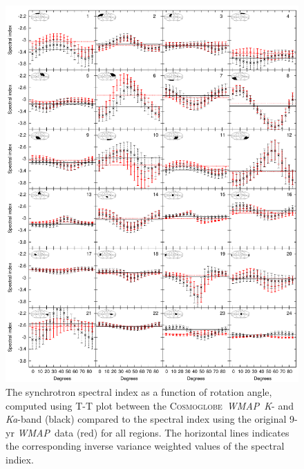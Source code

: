 \documentclass[twocolumn]{../../common/aa}
\def\WMAP{\emph{WMAP}}
\newcommand{\Cosmoglobe}{\textsc{Cosmoglobe}}
\newcommand{\K}[0]{\textit K}
\newcommand{\Ka}[0]{\textit{Ka}}
\begin{document}
\begin{figure}
	\centering
        \includegraphics[width=\linewidth]{figures/ut_big_multialphaplot.pdf}
	\caption{The synchrotron spectral index as a function of rotation angle, computed using T-T plot between the \Cosmoglobe\ \WMAP\ \K- and \Ka-band (black) compared to the spectral index using the original 9-yr \WMAP\ data (red) for all regions. The horizontal lines indicates the corresponding inverse variance weighted values of the spectral indiex.}
        \label{fig:beta_bigalpha}
\end{figure}


\end{document}
